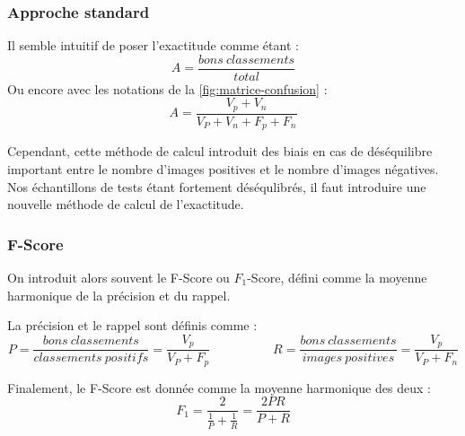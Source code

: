 \documentclass[12pt,a4paper]{article}
\begin{document}

\subsubsection{Approche standard}
Il semble intuitif de poser l'exactitude comme étant :
\[
    A = \frac{bons\ classements}{total} 
\]
Ou encore avec les notations de la \autoref{fig:matrice-confusion} :
\begin{equation}
    \boxed{A = \frac{V_p + V_n}{V_P + V_n + F_p + F_n}}
\end{equation}

Cependant, cette méthode de calcul introduit des biais en cas de déséquilibre important entre le nombre d'images positives et le nombre d'images négatives. Nos échantillons de tests étant fortement déséqulibrés, il faut introduire une nouvelle méthode de calcul de l'exactitude.

\subsubsection{F-Score}
On introduit alors souvent le F-Score ou $F_1$-Score, défini comme la moyenne harmonique de la précision et du rappel. \cite{powers}

La précision et le rappel sont définis comme :
\begin{equation}
    P = \frac{bons\ classements}{classements\ positifs} = \boxed{\frac{V_p}{V_P + F_p}}
    \hspace{5em}
    R = \frac{bons\ classements}{images\ positives} = \boxed{\frac{V_p}{V_P + F_n}}
\end{equation}

Finalement, le F-Score est donnée comme la moyenne harmonique des deux :
\begin{equation}
    \boxed{F_1 = \frac{2}{\frac{1}{P} + \frac{1}{R}} = \frac{2 P R}{P+R}}
\end{equation}
\end{document}
